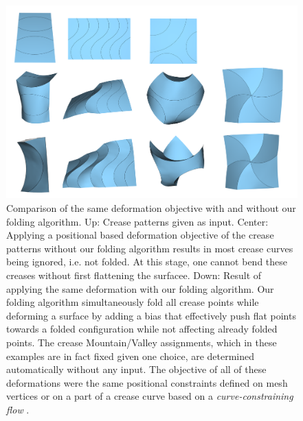 \begin{figure} [h]
	\centering
	\includegraphics[width=\linewidth]{figures/fold_bias_compare}
	\caption{Comparison of the same deformation objective with and without our folding algorithm. Up: Crease patterns given as input. Center: Applying a positional based deformation objective of the crease patterns without our folding algorithm results in most crease curves being ignored, i.e. not folded. At this stage, one cannot bend these creases without first flattening the surfacee. Down: Result of applying the same deformation with our folding algorithm. Our folding algorithm simultaneously fold all crease points while deforming a surface by adding a bias that effectively push flat points towards a folded configuration while not affecting already folded points. The crease Mountain/Valley assignments, which in these examples are in fact fixed given one choice, are determined automatically without any input. The objective of all of these deformations were the same positional constraints defined on mesh vertices or on a part of a crease curve based on a \textit{curve-constraining flow} \cite{rabi2018shape}. }
	\label{fig:folded_and_not_folded}
\end{figure}